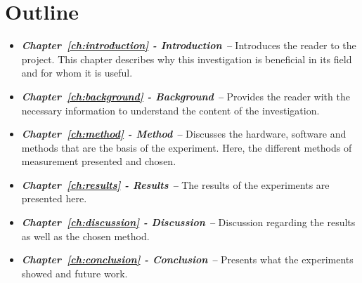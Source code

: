 \section{Outline}
\begin{itemize}
    \item \textit{\textbf{Chapter~\ref{ch:introduction} - Introduction --}} Introduces the reader to the project. This chapter describes why this investigation is beneficial in its field and for whom it is useful.
    \item \textit{\textbf{Chapter~\ref{ch:background} - Background --}} Provides the reader with the necessary information to understand the content of the investigation.
    \item \textit{\textbf{Chapter~\ref{ch:method} - Method --}} Discusses the hardware, software and methods that are the basis of the experiment. Here, the different methods of measurement presented and chosen.
    \item \textit{\textbf{Chapter~\ref{ch:results} - Results --}} The results of the experiments are presented here.
    \item \textit{\textbf{Chapter~\ref{ch:discussion} - Discussion --}} Discussion regarding the results as well as the chosen method.
    \item \textit{\textbf{Chapter~\ref{ch:conclusion} - Conclusion --}} Presents what the experiments showed and future work.
\end{itemize}
